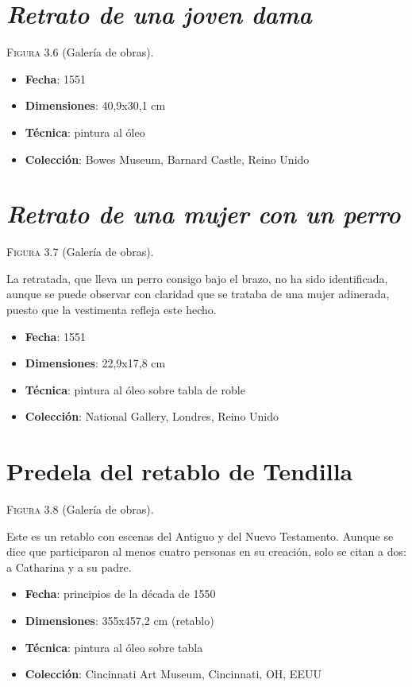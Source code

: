 \documentclass[12pt]{book}
\begin{document}
\section{\textit{Retrato de una joven dama}}

\textsc{Figura 3.6} (Galería de obras).\bigskip

\begin{itemize}
	\item \textbf{Fecha}: 1551
	\item \textbf{Dimensiones}: 40,9x30,1 cm
	\item \textbf{Técnica}: pintura al óleo
	\item \textbf{Colección}: Bowes Museum, Barnard Castle, Reino Unido
\end{itemize}

\section{\textit{Retrato de una mujer con un perro}}

\textsc{Figura 3.7} (Galería de obras).\bigskip

La retratada, que lleva un perro consigo bajo el brazo, no ha sido identificada, aunque se puede observar con claridad que se trataba de una mujer adinerada, puesto que la vestimenta refleja este hecho.
\begin{itemize}
	\item \textbf{Fecha}: 1551
	\item \textbf{Dimensiones}: 22,9x17,8 cm
	\item \textbf{Técnica}: pintura al óleo sobre tabla de roble
	\item \textbf{Colección}: National Gallery, Londres, Reino Unido
\end{itemize}

\section{Predela del retablo de Tendilla}

\textsc{Figura 3.8} (Galería de obras).\bigskip

Este es un retablo con escenas del Antiguo y del Nuevo Testamento. Aunque se dice que participaron al menos cuatro personas en su creación, solo se citan a dos: a Catharina y a su padre.
\begin{itemize}
	\item \textbf{Fecha}: principios de la década de 1550
	\item \textbf{Dimensiones}: 355x457,2 cm (retablo)
	\item \textbf{Técnica}: pintura al óleo sobre tabla
	\item \textbf{Colección}: Cincinnati Art Museum, Cincinnati, OH, EEUU
\end{itemize}
\end{document}
